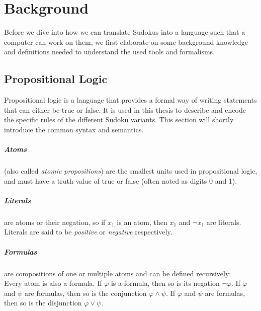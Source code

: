 
\chapter{Background}
Before we dive into how we can translate Sudokus into a language such that a computer can work on them, we first elaborate on some background knowledge and definitions needed to understand the used tools and formalisms.

\section{Propositional Logic}
Propositional logic is a language that provides a formal way of writing statements that can either be true or false. It is used in this thesis to describe and encode the specific rules of the different Sudoku variants. This section will shortly introduce the common syntax and semantics.

\paragraph{Atoms}
(also called \emph{atomic propositions}) are the smallest units used in propositional logic, and must have a truth value of true or false (often noted as digits 0 and 1).

\paragraph{Literals}
are atoms or their negation, so if $x_1$ is an atom, then $x_1$ and $\neg x_1$ are literals. Literals are said to be \emph{positive} or \emph{negative} respectively.


\paragraph{Formulas} are compositions of one or multiple atoms and can be defined recursively:\\
Every atom is also a formula.
If $\varphi$ is a formula, then so is its negation $\neg\varphi$.
If $\varphi$ and $\psi$ are formulas, then so is the conjunction $\varphi \land \psi$.
If $\varphi$ and $\psi$ are formulas, then so is the disjunction $\varphi \lor \psi$.



